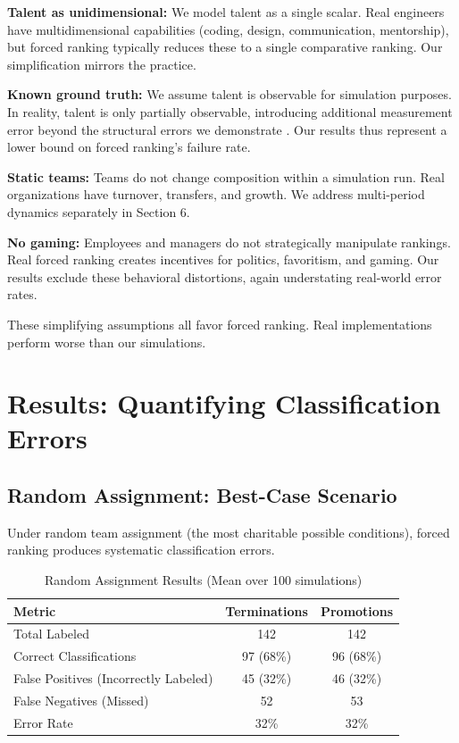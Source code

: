 \documentclass[12pt]{article}
\begin{document}
\textbf{Talent as unidimensional:} We model talent as a single scalar. Real engineers have multidimensional capabilities (coding, design, communication, mentorship), but forced ranking typically reduces these to a single comparative ranking. Our simplification mirrors the practice.

\textbf{Known ground truth:} We assume talent is observable for simulation purposes. In reality, talent is only partially observable, introducing additional measurement error beyond the structural errors we demonstrate \citep{cardinaels2021forced}. Our results thus represent a lower bound on forced ranking's failure rate.

\textbf{Static teams:} Teams do not change composition within a simulation run. Real organizations have turnover, transfers, and growth. We address multi-period dynamics separately in Section 6.

\textbf{No gaming:} Employees and managers do not strategically manipulate rankings. Real forced ranking creates incentives for politics, favoritism, and gaming. Our results exclude these behavioral distortions, again understating real-world error rates.

These simplifying assumptions all favor forced ranking. Real implementations perform worse than our simulations.

\section{Results: Quantifying Classification Errors}

\subsection{Random Assignment: Best-Case Scenario}

Under random team assignment (the most charitable possible conditions), forced ranking produces systematic classification errors.

\begin{table}[h]
\centering
\caption{Random Assignment Results (Mean over 100 simulations)}
\label{tab:random}
\begin{tabular}{lcc}
\toprule
\textbf{Metric} & \textbf{Terminations} & \textbf{Promotions} \\
\midrule
Total Labeled & 142 & 142 \\
Correct Classifications & 97 (68\%) & 96 (68\%) \\
False Positives (Incorrectly Labeled) & 45 (32\%) & 46 (32\%) \\
False Negatives (Missed) & 52 & 53 \\
Error Rate & 32\% & 32\% \\
\bottomrule
\end{tabular}
\end{table}
\end{document}
